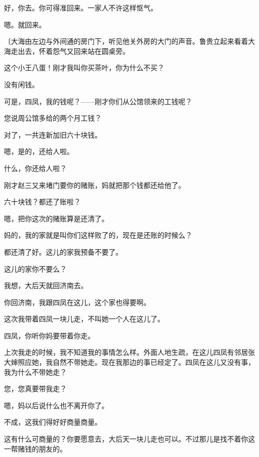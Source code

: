 好，你去。你可得准回来。一家人不许这样怄气。

嗯。就回来。

{\fangsong〔大海由左边与外间通的房门下，听见他关外房的大门的声音。鲁贵立起来看着大海走出去，怀着怨气又回来站在圆桌旁。}

这个小王八蛋！刚才我叫你买茶叶，你为什么不买？

没有闲钱。

可是，四凤，我的钱呢？——刚才你们从公馆领来的工钱呢？

您说周公馆多给的两个月工钱？

对了，一共连新加旧六十块钱。

嗯，是的，还给人啦。

什么，你还给人啦？

刚才赵三又来堵门要你的赌账，妈就把那个钱都还给他了。

六十块钱？都还了账啦？

嗯，把你这次的赌账算是还清了。

妈的，我的家就是叫你们这样败了的，现在是还账的时候么？

都还清了好。这儿的家我预备不要了。

这儿的家你不要么？

我想，大后天就回济南去。

你回济南，我跟四凤在这儿，这个家也得要啊。

这次我带着四凤一块儿走，不叫她一个人在这儿了。

四凤，你听你妈要带着你走。

上次我走的时候，我不知道我的事情怎么样。外面人地生疏，在这儿四凤有邻居张大婶照应她，我自然不带她走。现在我那边的事已经定了。四凤在这儿又没有事，我为什么不带她走？

您，您真要带我走？

嗯，妈以后说什么也不离开你了。

不成，这我们得好好商量商量。

这有什么可商量的？你要愿意去，大后天一块儿走也可以。不过那儿是找不着你这一帮赌钱的朋友的。

